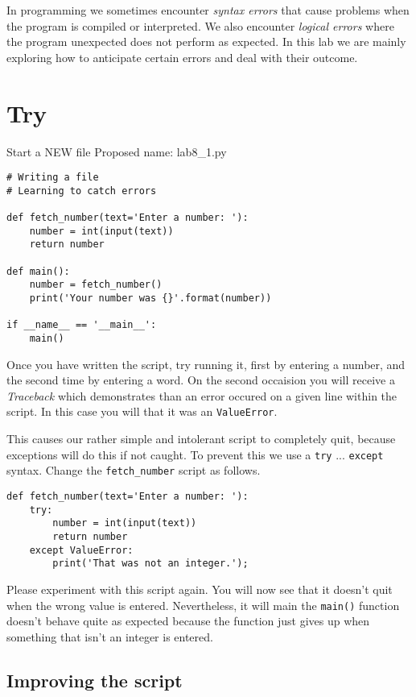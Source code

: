 \documentclass[12pt,oneside]{cttutorial}
\begin{document}
In programming we sometimes encounter \emph{syntax errors} that cause problems when the program is compiled or interpreted. We also encounter \emph{logical errors} where the program unexpected does not perform as expected. In this lab we are mainly exploring how to anticipate certain errors and deal with their outcome.

\section{Try}

\alert{Start a NEW file}
Proposed name: lab8\_1.py
\begin{lstlisting}
# Writing a file
# Learning to catch errors

def fetch_number(text='Enter a number: '):
    number = int(input(text))
    return number

def main():
    number = fetch_number()
    print('Your number was {}'.format(number))

if __name__ == '__main__':
    main()
\end{lstlisting}

Once you have written the script, try running it, first by entering a number, and the second time by entering a word. On the second occaision you will receive a \emph{Traceback} which demonstrates than an error occured on a given line within the script. In this case you will that it was an \lstinline!ValueError!.

This causes our rather simple and intolerant script to completely quit, because exceptions will do this if not caught. To prevent this we use a \lstinline!try! ... \lstinline!except! syntax. Change the \lstinline!fetch_number! script as follows.

\begin{lstlisting}
def fetch_number(text='Enter a number: '):
    try:
        number = int(input(text))
        return number
    except ValueError:
        print('That was not an integer.');
\end{lstlisting}

Please experiment with this script again. You will now see that it doesn't quit when the wrong value is entered. Nevertheless, it will main the \lstinline!main()! function doesn't behave quite as expected because the function just gives up when something that isn't an integer is entered.

\subsection{Improving the script}
\end{document}
